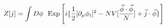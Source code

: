 \begin{equation}
Z[j] = \int D \phi~~{\rm Exp} \left[ i \{ \frac{1}{2 }[\partial_\mu
\phi_i]^2 - N
V[\frac{\vec \phi \cdot \vec \phi}{N}] +\vec j \cdot \vec \phi \} \right] \end{equation}

